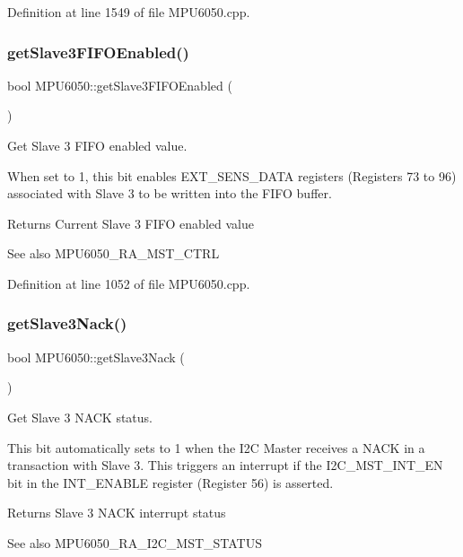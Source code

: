 Definition at line 1549 of file M\+P\+U6050.\+cpp.

\mbox{\label{classMPU6050_a9d75ec63e2320ecfb84a2b082397f900}} 
\subsubsection{\texorpdfstring{getSlave3FIFOEnabled()}{getSlave3FIFOEnabled()}}
{\footnotesize\ttfamily bool M\+P\+U6050\+::get\+Slave3\+F\+I\+F\+O\+Enabled (\begin{DoxyParamCaption}{ }\end{DoxyParamCaption})}



Get Slave 3 F\+I\+FO enabled value. 

When set to 1, this bit enables E\+X\+T\+\_\+\+S\+E\+N\+S\+\_\+\+D\+A\+TA registers (Registers 73 to 96) associated with Slave 3 to be written into the F\+I\+FO buffer. \begin{DoxyReturn}{Returns}
Current Slave 3 F\+I\+FO enabled value 
\end{DoxyReturn}
\begin{DoxySeeAlso}{See also}
M\+P\+U6050\+\_\+\+R\+A\+\_\+\+M\+S\+T\+\_\+\+C\+T\+RL 
\end{DoxySeeAlso}


Definition at line 1052 of file M\+P\+U6050.\+cpp.

\mbox{\label{classMPU6050_a55f24d2f2b13d6e28a7c8b6bf2913520}} 
\subsubsection{\texorpdfstring{getSlave3Nack()}{getSlave3Nack()}}
{\footnotesize\ttfamily bool M\+P\+U6050\+::get\+Slave3\+Nack (\begin{DoxyParamCaption}{ }\end{DoxyParamCaption})}



Get Slave 3 N\+A\+CK status. 

This bit automatically sets to 1 when the I2C Master receives a N\+A\+CK in a transaction with Slave 3. This triggers an interrupt if the I2\+C\+\_\+\+M\+S\+T\+\_\+\+I\+N\+T\+\_\+\+EN bit in the I\+N\+T\+\_\+\+E\+N\+A\+B\+LE register (Register 56) is asserted. \begin{DoxyReturn}{Returns}
Slave 3 N\+A\+CK interrupt status 
\end{DoxyReturn}
\begin{DoxySeeAlso}{See also}
M\+P\+U6050\+\_\+\+R\+A\+\_\+\+I2\+C\+\_\+\+M\+S\+T\+\_\+\+S\+T\+A\+T\+US 
\end{DoxySeeAlso}


